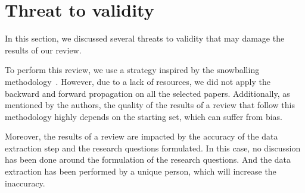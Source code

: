 \section{Threat to validity}

In this section, we discussed several threats to validity that may damage the results of our review.

To perform this review, we use a strategy inspired by the snowballing methodology~\cite{DBLP:conf/ease/Wohlin14}.
However,  due to a lack of resources, we did not apply the backward and forward propagation on all the selected papers.
Additionally, as mentioned by the authors, the quality of the results of a review that follow this methodology highly depends on the starting set, which can suffer from bias.

Moreover, the results of a review are impacted by the accuracy of the data extraction step and the research questions formulated.
In this case, no discussion has been done around the formulation of the research questions.
And the data extraction has been performed by a unique person, which will increase the inaccuracy.

